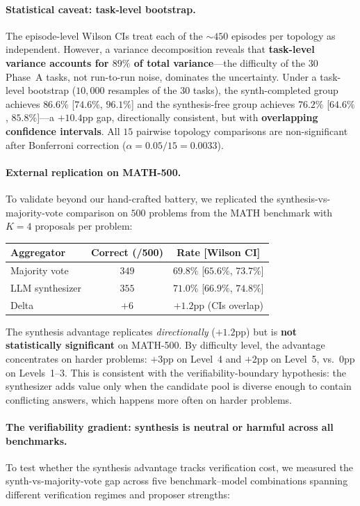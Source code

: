\documentclass[11pt]{amsart}
\renewcommand{\a}{\alpha}
\newcommand\1{{\mathds{1}}}
\theoremstyle{definition}
\theoremstyle{remark}
\numberwithin{equation}{section}
\begin{document}
\paragraph{Statistical caveat: task-level bootstrap.}
The episode-level Wilson CIs treat each of the $\sim\!450$ episodes per topology as independent.
However, a variance decomposition reveals that \textbf{task-level variance accounts for $89\%$ of total variance}---the difficulty of the $30$ Phase~A tasks, not run-to-run noise, dominates the uncertainty.
Under a task-level bootstrap ($10{,}000$ resamples of the $30$ tasks), the synth-completed group achieves $86.6\%$ [$74.6\%$, $96.1\%$] and the synthesis-free group achieves $76.2\%$ [$64.6\%$, $85.8\%$]---a $+10.4$pp gap, directionally consistent, but with \textbf{overlapping confidence intervals}.
All $15$ pairwise topology comparisons are non-significant after Bonferroni correction ($\a = 0.05/15 = 0.0033$).

\paragraph{External replication on MATH-500.}
To validate beyond our hand-crafted battery, we replicated the synthesis-vs-majority-vote comparison on $500$ problems from the MATH benchmark \cite{Hendrycks2021MATH} with $K\!=\!4$ proposals per problem:
\begin{center}\small
\begin{tabular}{lcc}
\toprule
Aggregator & Correct (/500) & Rate [Wilson CI] \\
\midrule
Majority vote & $349$ & $69.8\%$ [$65.6\%$, $73.7\%$] \\
LLM synthesizer & $355$ & $71.0\%$ [$66.9\%$, $74.8\%$] \\
\midrule
Delta & $+6$ & $+1.2$pp (CIs overlap) \\
\bottomrule
\end{tabular}
\end{center}
The synthesis advantage replicates \emph{directionally} ($+1.2$pp) but is \textbf{not statistically significant} on MATH-500.
By difficulty level, the advantage concentrates on harder problems: $+3$pp on Level~4 and $+2$pp on Level~5, vs.\ $0$pp on Levels~1--3.
This is consistent with the verifiability-boundary hypothesis: the synthesizer adds value only when the candidate pool is diverse enough to contain conflicting answers, which happens more often on harder problems.

\paragraph{The verifiability gradient: synthesis is neutral or harmful across all benchmarks.}
To test whether the synthesis advantage tracks verification cost, we measured the synth-vs-majority-vote gap across five benchmark--model combinations spanning different verification regimes and proposer strengths:
\end{document}
